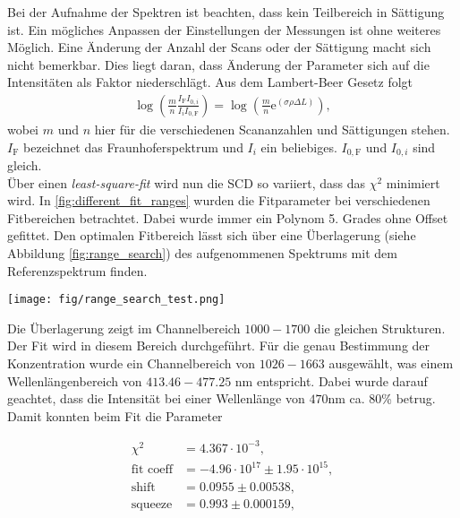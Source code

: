 \documentclass[12pt, a4paper, bibliography=totoc]{scrartcl}
\begin{document}
\begin{multicols}{2}
Bei der Aufnahme der Spektren ist beachten, dass kein Teilbereich in Sättigung ist. 
Ein mögliches Anpassen der Einstellungen der Messungen ist ohne weiteres Möglich. 
Eine Änderung der Anzahl der Scans oder der Sättigung macht sich nicht bemerkbar.
Dies liegt daran, dass Änderung der Parameter sich auf die Intensitäten als Faktor niederschlägt. 
Aus dem Lambert-Beer Gesetz folgt
\begin{align}
    \log \left( \frac{m}{n} \frac{I_\text{F} I_{0, i}}{I_i I_{0, \text{F}}} \right) = \log \left(\frac{m}{n} \text{e}^{(\sigma \rho \Delta L)}\right) ,
\end{align}
wobei $m$ und $n$ hier für die verschiedenen Scananzahlen und Sättigungen stehen. 
$I_\text{F}$ bezeichnet das Fraunhoferspektrum und $I_i$ ein beliebiges.
$I_{0, \text{F}}$ und $I_{0, i}$ sind gleich.
\\
Über einen \textit{least-square-fit} wird nun die SCD so variiert, dass das $\chi^2$ minimiert wird. 
In \ref{fig:different_fit_ranges} wurden die Fitparameter bei verschiedenen Fitbereichen betrachtet. 
Dabei wurde immer ein Polynom 5. Grades ohne Offset gefittet.
Den optimalen Fitbereich lässt sich über eine Überlagerung (siehe Abbildung \ref{fig:range_search}) des aufgenommenen Spektrums mit dem  Referenzspektrum finden.

\begin{center}
	\texttt{[image: fig/range\_search\_test.png]}
	\label{fig:range_search}
\end{center}

Die Überlagerung zeigt im Channelbereich $1000-1700$ die gleichen Strukturen. Der Fit wird in diesem Bereich durchgeführt.
Für die genau Bestimmung der  Konzentration wurde ein Channelbereich von $1026-1663$ ausgewählt, was einem Wellenlängenbereich von $413.46 - 477.25$ \si{nm} entspricht.
Dabei wurde darauf geachtet, dass die Intensität bei einer Wellenlänge von $470$\si{nm} ca. $80$\% betrug.
Damit konnten beim Fit die Parameter

\begin{align}
	\chi^2 &= 4.367 \cdot 10^{-3},\\
    \text{fit coeff} &= -4.96 \cdot 10^{17} \pm 1.95 \cdot 10^{15},\\
    \text{shift} &= 0.0955 \pm 0.00538,\\
    \text{squeeze} &= 0.993 \pm 0.000159, 
\end{align}


\end{multicols}
\end{document}
